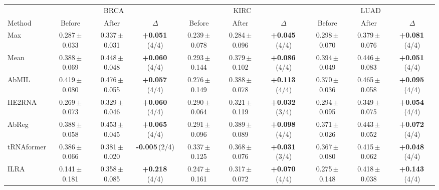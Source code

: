 \begin{tabular}{lccccccccc}
\toprule
& \multicolumn{3}{c}{BRCA} & \multicolumn{3}{c}{KIRC} & \multicolumn{3}{c}{LUAD}\\
\cmidrule(lr){2-4}\cmidrule(lr){5-7}\cmidrule(lr){8-10}
Method & Before & After & $\Delta$ & Before & After & $\Delta$ & Before & After & $\Delta$\\
\midrule
Max & 0.287\,{\tiny$\pm$0.033} & 0.337\,{\tiny$\pm$0.031} & \textbf{+0.051}\,{\tiny(4/4)} & 0.239\,{\tiny$\pm$0.078} & 0.284\,{\tiny$\pm$0.096} & \textbf{+0.045}\,{\tiny(4/4)} & 0.298\,{\tiny$\pm$0.070} & 0.379\,{\tiny$\pm$0.076} & \textbf{+0.081}\,{\tiny(4/4)}\\
Mean & 0.388\,{\tiny$\pm$0.069} & 0.448\,{\tiny$\pm$0.048} & \textbf{+0.060}\,{\tiny(4/4)} & 0.293\,{\tiny$\pm$0.144} & 0.379\,{\tiny$\pm$0.102} & \textbf{+0.086}\,{\tiny(4/4)} & 0.394\,{\tiny$\pm$0.049} & 0.446\,{\tiny$\pm$0.083} & \textbf{+0.051}\,{\tiny(4/4)}\\
AbMIL & 0.419\,{\tiny$\pm$0.080} & 0.476\,{\tiny$\pm$0.055} & \textbf{+0.057}\,{\tiny(4/4)} & 0.276\,{\tiny$\pm$0.149} & 0.388\,{\tiny$\pm$0.078} & \textbf{+0.113}\,{\tiny(4/4)} & 0.370\,{\tiny$\pm$0.036} & 0.465\,{\tiny$\pm$0.058} & \textbf{+0.095}\,{\tiny(4/4)}\\
HE2RNA & 0.269\,{\tiny$\pm$0.073} & 0.329\,{\tiny$\pm$0.046} & \textbf{+0.060}\,{\tiny(4/4)} & 0.290\,{\tiny$\pm$0.064} & 0.321\,{\tiny$\pm$0.119} & \textbf{+0.032}\,{\tiny(3/4)} & 0.294\,{\tiny$\pm$0.095} & 0.349\,{\tiny$\pm$0.075} & \textbf{+0.054}\,{\tiny(4/4)}\\
AbReg & 0.388\,{\tiny$\pm$0.058} & 0.453\,{\tiny$\pm$0.045} & \textbf{+0.065}\,{\tiny(4/4)} & 0.291\,{\tiny$\pm$0.096} & 0.389\,{\tiny$\pm$0.089} & \textbf{+0.098}\,{\tiny(4/4)} & 0.371\,{\tiny$\pm$0.026} & 0.443\,{\tiny$\pm$0.052} & \textbf{+0.072}\,{\tiny(4/4)}\\
tRNAformer & 0.386\,{\tiny$\pm$0.066} & 0.381\,{\tiny$\pm$0.020} & \textbf{-0.005}\,{\tiny(2/4)} & 0.337\,{\tiny$\pm$0.125} & 0.368\,{\tiny$\pm$0.076} & \textbf{+0.031}\,{\tiny(3/4)} & 0.367\,{\tiny$\pm$0.080} & 0.415\,{\tiny$\pm$0.062} & \textbf{+0.048}\,{\tiny(4/4)}\\
ILRA & 0.141\,{\tiny$\pm$0.181} & 0.358\,{\tiny$\pm$0.085} & \textbf{+0.218}\,{\tiny(4/4)} & 0.247\,{\tiny$\pm$0.161} & 0.317\,{\tiny$\pm$0.072} & \textbf{+0.070}\,{\tiny(4/4)} & 0.275\,{\tiny$\pm$0.148} & 0.418\,{\tiny$\pm$0.038} & \textbf{+0.143}\,{\tiny(4/4)}\\

\end{tabular}

